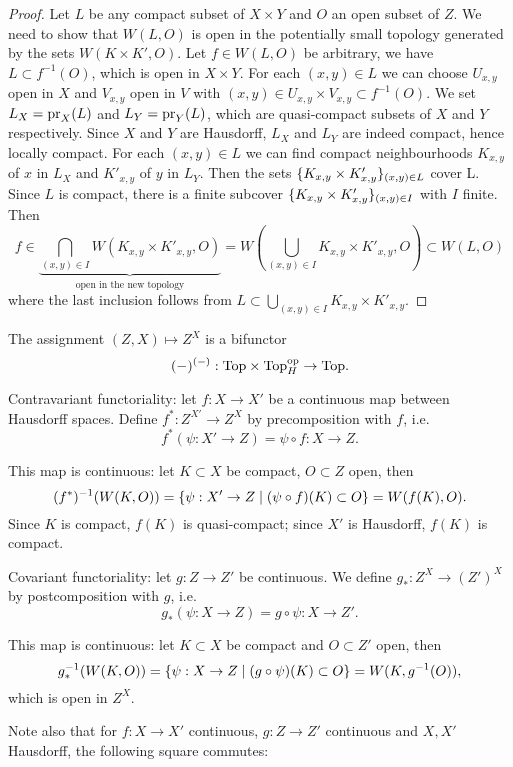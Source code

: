 \begin{proof}
Let $L$ be any compact subset of $X\times Y$ and $O$ an open subset of $Z$. We need to show that $W(L,O)$ is open in the potentially small topology generated by the sets $W(K\times K',O)$. Let $f\in W(L,O)$ be arbitrary, we have $L\subset f^{-1}(O)$, which is open in $X\times Y$. For each $(x,y)\in L$ we can choose $U_{x,y}$ open in $X$ and $V_{x,y}$ open in $V$ with $(x,y)\in U_{x,y}\times V_{x,y}\subset f^{-1}(O)$. We set $L_X=\operatorname{pr}_X(L)$ and $L_Y=\operatorname{pr}_Y(L)$, which are quasi-compact subsets of $X$ and $Y$ respectively. Since $X$ and $Y$ are Hausdorff, $L_X$ and $L_Y$ are indeed compact, hence locally compact. For each $(x,y)\in L$ we can find compact neighbourhoods $K_{x,y}$ of $x$ in $L_X$ and $K'_{x,y}$ of $y$ in $L_Y$. Then the sets $\{K_{x,y}\times K'_{x,y}\}_{(x,y)\in L}$ cover L. Since $L$ is compact, there is a finite subcover $\{K_{x,y}\times K'_{x,y}\}_{(x,y)\in I}$ with $I$ finite. Then
\[f\in\underbrace{\bigcap_{(x,y)\in I}W(K_{x,y}\times K'_{x,y},O)}_{\text{open in the new topology}}=W(\bigcup_{(x,y)\in I}K_{x,y}\times K'_{x,y},O)\subset W(L,O)\]
where the last inclusion follows from $L\subset \bigcup_{(x,y)\in I}K_{x,y}\times K'_{x,y}$.
\end{proof}

\begin{remark}
The assignment $(Z,X)\mapsto Z^X$ is a bifunctor
\[(-)^{(-)}:{\mathrm{Top}}\times{\mathrm{Top}}^{\operatorname{op}}_{H}\to {\mathrm{Top}}.\]

Contravariant functoriality: let $f:X\to X'$ be a continuous map between Hausdorff spaces. Define $f^*:Z^{X'}\to Z^X$ by precomposition with $f$, i.e.
\[f^*(\psi:X'\to Z)=\psi\circ f:X\to Z.\]

This map is continuous: let $K\subset X$ be compact, $O\subset Z$ open, then
\[(f^*)^{-1}(W(K,O))=\{\psi:X'\to Z\mid (\psi\circ f)(K)\subset O\}=W(f(K),O).\]
Since $K$ is compact, $f(K)$ is quasi-compact; since $X'$ is Hausdorff, $f(K)$ is compact.

Covariant functoriality: let $g:Z\to Z'$ be continuous. We define $g_*:Z^X\to (Z')^X$ by postcomposition with $g$, i.e.
\[g_*(\psi:X\to Z)=g\circ\psi:X\to Z'.\]

This map is continuous: let $K\subset X$ be compact and $O\subset Z'$ open, then
\[g_*^{-1}(W(K,O))=\{\psi:X\to Z\mid (g\circ\psi)(K)\subset O\}=W(K,g^{-1}(O)),\]
which is open in $Z^X$.

Note also that for $f:X\to X'$ continuous, $g:Z\to Z'$ continuous and $X,X'$ Hausdorff, the following square commutes:
\begin{center}
\end{center}
\end{remark}

